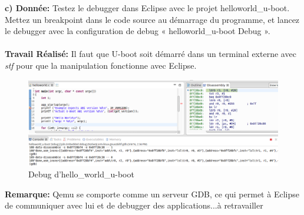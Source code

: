 \textbf{c) Donnée: } Testez le debugger dans Eclipse avec le projet helloworld\_u-boot. Mettez un breakpoint dans le
code source au démarrage du programme, et lancez le debugger avec la configuration de debug
« helloworld\_u-boot Debug ». \\\\
\textbf{Travail Réalisé: } Il faut que U-boot soit démarré dans un terminal externe avec \textit{stf} pour que la manipulation fonctionne avec Eclipse.
\begin{figure}[H]
	\begin{center}
		\includegraphics[width=18cm]{img/ubootCommand2.png}
		\caption{Debug d'hello\_world\_u-boot}
		\label{ubootComm2}
	\end{center}
\end{figure}
\textbf{Remarque: }\color{red}Qemu se comporte comme un serveur GDB, ce qui permet à Eclipse  de communiquer avec lui et de debugger des applications...à retravailler\color{black}
